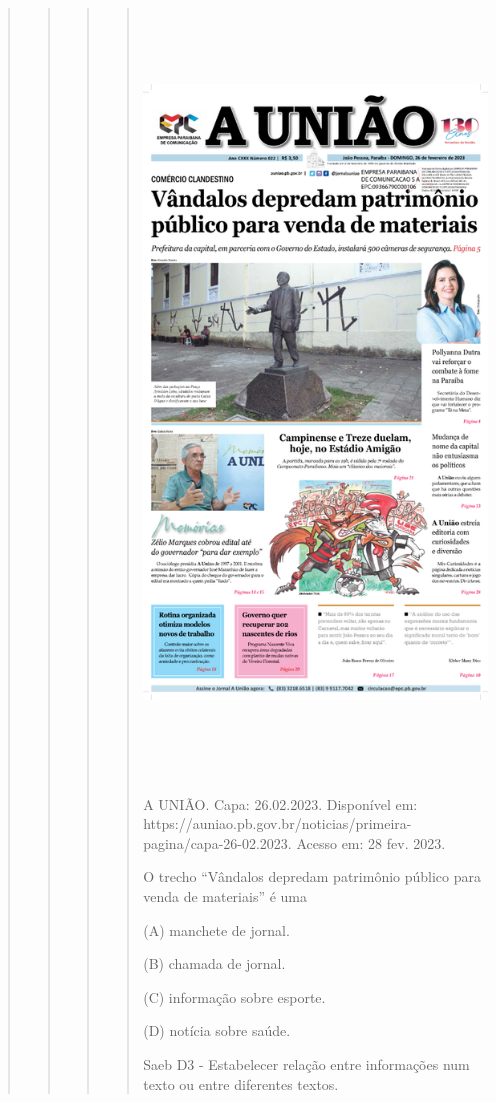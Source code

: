 \begin{quote}
\begin{quote}
\begin{quote}
\begin{quote}
\includegraphics[width=4.47917in,height=8.00000in]{media/image37.png}

A UNIÃO. Capa: 26.02.2023. Disponível em:
https://auniao.pb.gov.br/noticias/primeira-pagina/capa-26-02.2023.
Acesso em: 28 fev. 2023.

O trecho ``Vândalos depredam patrimônio público para venda de
materiais'' é uma

(A) manchete de jornal.

(B) chamada de jornal.

(C) informação sobre esporte.

(D) notícia sobre saúde.

Saeb D3 - Estabelecer relação entre informações num texto ou entre
diferentes textos.


\end{quote}
\end{quote}
\end{quote}
\end{quote}
